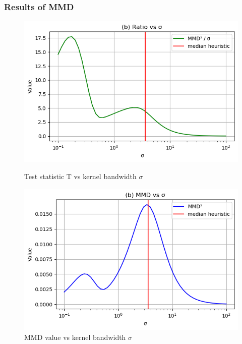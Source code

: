 \documentclass{beamer}
\begin{document}
\begin{frame}
    \frametitle{Results of MMD}

    \begin{figure}[h]
        \centering
        \begin{minipage}{0.48\textwidth}
            \includegraphics[width=\linewidth]{t_vs_sigma.png}
            \caption{Test statistic T vs kernel bandwidth $\sigma$}
        \end{minipage}
        \hfill
        \begin{minipage}{0.48\textwidth}
            \includegraphics[width=\linewidth]{MMD vs sigma.png}
            \caption{MMD value vs kernel bandwidth $\sigma$}
        \end{minipage}
    \end{figure}
\end{frame}
\end{document}
